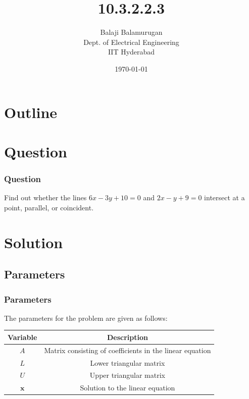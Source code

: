 \documentclass{beamer}
\title{10.3.2.2.3}
\author{Balaji Balamurugan \\ Dept. of Electrical Engineering \\ IIT Hyderabad}
\date{\today}
\theoremstyle{remark}
\let\vec\mathbf
\numberwithin{equation}{section}
\begin{document}
\begin{frame}
\titlepage
\end{frame}

\section*{Outline}
\begin{frame}
\tableofcontents
\end{frame}

\section{Question}
\begin{frame}
\frametitle{Question}
Find out whether the lines $6x-3y+10=0$ and $2x-y+9=0$ intersect at a point, parallel, or coincident.
\end{frame}

\section{Solution}
\subsection{Parameters}
\begin{frame}
\frametitle{Parameters}
The parameters for the problem are given as follows:\\ 
\begin{tabular}{|c|c|}
    \hline
     \textbf{Variable}&\textbf{Description}\\
     \hline
     $A$& Matrix consisting of coefficients in the linear equation\\
     \hline
     $L$& Lower triangular matrix\\
     \hline
     $U$& Upper triangular matrix\\
     \hline
     $\vec{x}$ & Solution to the linear equation\\
     \hline
\end{tabular}
    

\end{frame}
\end{document}
